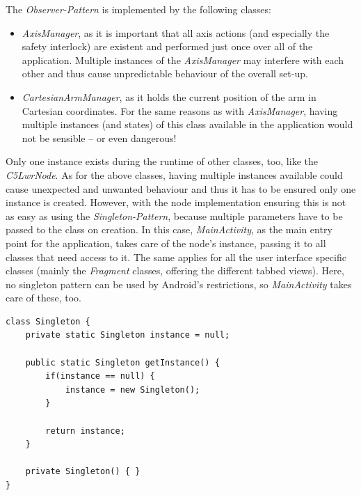 The \textit{Observer-Pattern} is implemented by the following classes:
\begin{itemize}
	\item \textit{AxisManager}, as it is important that all axis actions (and especially the safety interlock) are existent and performed just once over all of the application. Multiple instances of the \textit{AxisManager} may interfere with each other and thus cause unpredictable behaviour of the overall set-up.
	\item \textit{CartesianArmManager}, as it holds the current position of the arm in Cartesian coordinates. For the same reasons as with \textit{AxisManager}, having multiple instances (and states) of this class available in the application would not be sensible -- or even dangerous!
\end{itemize}

Only one instance exists during the runtime of other classes, too, like the \textit{C5LwrNode}. As for the above classes, having multiple instances available could cause unexpected and unwanted behaviour and thus it has to be ensured only one instance is created. However, with the node implementation ensuring this is not as easy as using the \textit{Singleton-Pattern}, because multiple parameters have to be passed to the class on creation. In this case, \textit{MainActivity}, as the main entry point for the application, takes care of the node's instance, passing it to all classes that need access to it. The same applies for all the user interface specific classes (mainly the \textit{Fragment} classes, offering the different tabbed views). Here, no singleton pattern can be used by Android's restrictions, so \textit{MainActivity} takes care of these, too.

\begin{minipage}{\linewidth}
\begin{lstlisting}[caption={Example implementation of the Observer-Pattern}, label=lst:conc:obs]
class Singleton {
	private static Singleton instance = null;

	public static Singleton getInstance() {
		if(instance == null) {
			instance = new Singleton();
		}
		
		return instance;
	}
	
	private Singleton() { }
}
\end{lstlisting}
\end{minipage}
